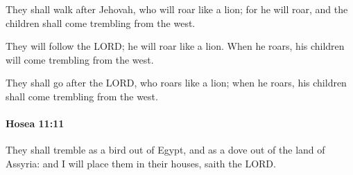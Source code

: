 			\begin{versebox}
					\item[BHS] 
					\item[LXX] 
					\item[ASV] They shall walk after Jehovah, who will roar like a lion; for he will roar, and the children shall come trembling from the west.
					\item[NIV] They will follow the LORD; he will roar like a lion. When he roars, his children will come trembling from the west.
					\item[NRSV] They shall go after the LORD, who roars like a lion; when he roars, his children shall come trembling from the west.
			\end{versebox}

		\paragraph{Hosea 11:11} %
			\label{HOSEA-11-11}

			They shall tremble as a bird out of Egypt, and as a dove out of the land of Assyria: and I will place them in their houses, saith the LORD.

